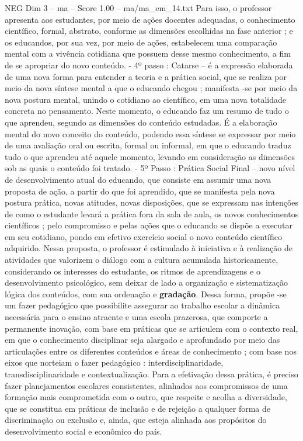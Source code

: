 \begin{textsample}{NEG Dim 3 – ma – Score 1.00 – ma/ma\_em\_14.txt}
Para isso, o professor apresenta aos estudantes, por meio de ações docentes adequadas, o conhecimento científico, formal, abstrato, conforme as dimensões escolhidas na fase anterior ; e os educandos, por sua vez, por meio de ações, estabelecem uma comparação mental com a vivência cotidiana que possuem desse mesmo conhecimento, a fim de se apropriar do novo conteúdo. - 4º passo : Catarse – é a expressão elaborada de uma nova forma para entender a teoria e a prática social, que se realiza por meio da nova síntese mental a que o educando chegou ; manifesta -se por meio da nova postura mental, unindo o cotidiano ao científico, em uma nova totalidade concreta no pensamento.
Neste momento, o educando faz um resumo de tudo o que aprendeu, segundo as dimensões do conteúdo estudadas.
É a elaboração mental do novo conceito do conteúdo, podendo essa síntese se expressar por meio de uma avaliação oral ou escrita, formal ou informal, em que o educando traduz tudo o que aprendeu até aquele momento, levando em consideração as dimensões sob as quais o conteúdo foi tratado. - 5º Passo : Prática Social Final – novo nível de desenvolvimento atual do educando, que consiste em assumir uma nova proposta de ação, a partir do que foi aprendido, que se manifesta pela nova postura prática, novas atitudes, novas disposições, que se expressam nas intenções de como o estudante levará a prática fora da sala de aula, os novos conhecimentos científicos ; pelo compromisso e pelas ações que o educando se dispõe a executar em seu cotidiano, pondo em efetivo exercício social o novo conteúdo científico adquirido.
Nessa proposta, o professor é estimulado à iniciativa e à realização de atividades que valorizem o diálogo com a cultura acumulada historicamente, considerando os interesses do estudante, os ritmos de aprendizagens e o desenvolvimento psicológico, sem deixar de lado a organização e sistematização lógica dos conteúdos, com sua ordenação e \textbf{gradação}.
Dessa forma, propõe -se um fazer pedagógico que possibilite assegurar ao trabalho escolar a dinâmica necessária para o ensino atraente e uma escola prazerosa, que comporte a permanente inovação, com base em práticas que se articulem com o contexto real, em que o conhecimento disciplinar seja alargado e aprofundado por meio das articulações entre os diferentes conteúdos e áreas de conhecimento ; com base nos eixos que norteiam o fazer pedagógico : interdisciplinaridade, transdisciplinaridade e contextualização.
Para a efetivação dessa prática, é preciso fazer planejamentos escolares consistentes, alinhados aos compromissos de uma formação mais comprometida com o outro, que respeite e acolha a diversidade, que se constitua em práticas de inclusão e de rejeição a qualquer forma de discriminação ou exclusão e, ainda, que esteja alinhada aos propósitos do desenvolvimento social e econômico do país.

\end{textsample}
